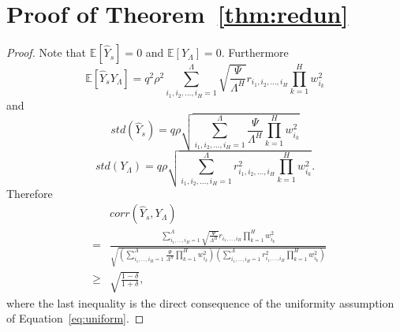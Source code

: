 \documentclass[twoside]{article}
\begin{document}
\section{Proof of Theorem~\ref{thm:redun}}
\begin{proof}
Note that $\mathbb{E}[\hat{Y}_s] = 0$ and $\mathbb{E}[Y_{\Lambda}] = 0$. Furthermore
\[\mathbb{E}[\hat{Y}_sY_{\Lambda}] = q^2\rho^2\sum_{i_1,i_2,\dots,i_H=1}^{\Lambda}\sqrt{\frac{\Psi}{\Lambda^H}}r_{i_1,i_2,\dots,i_H}\prod_{k = 1}^{H}w_{i_k}^2
\]
and
\[std(\hat{Y}_s) = q\rho\sqrt{\sum_{i_1,i_2,\dots,i_H=1}^{\Lambda}\frac{\Psi}{\Lambda^H}\prod_{k = 1}^{H}w_{i_k}^2}
\]
\[std(Y_{\Lambda}) = q\rho\sqrt{\sum_{i_1,i_2,\dots,i_H=1}^{\Lambda}r_{i_1,i_2,\dots,i_H}^2\prod_{k = 1}^{H}w_{i_k}^2}.
\]
Therefore
\begin{eqnarray*}
&&\!\!\!\!\!\!\!\!\!corr(\hat{Y}_s,Y_{\Lambda})\\ 
&\!\!\!\!\!\!\!\!\!=&\!\!\!\!\!\!\! \frac{\displaystyle\sum_{i_1,\dots,i_H=1}^{\Lambda}\sqrt{\frac{\Psi}{\Lambda^H}}r_{i_1,\dots,i_H}\prod_{k = 1}^{H}w_{i_k}^2}{\sqrt{\!\!\!\left(\displaystyle\sum_{i_1,\dots,i_H=1}^{\Lambda}\frac{\Psi}{\Lambda^H}\prod_{k = 1}^{H}w_{i_k}^2\right)\!\!\!\!\left(\displaystyle\sum_{i_1,\dots,i_H=1}^{\Lambda}\!\!\!\!\!r_{i_1,\dots,i_H}^2\prod_{k = 1}^{H}w_{i_k}^2\right)}}\\
&\!\!\!\!\!\!\!\!\geq& \sqrt{\frac{1-\delta}{1+\delta}}, 
\end{eqnarray*}
where the last inequality is the direct consequence of the uniformity assumption of Equation~\ref{eq:uniform}.
\end{proof}
\end{document}
